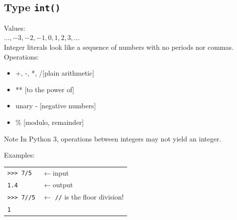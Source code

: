 \documentclass[t,handout,9pt]{beamer}
\begin{document}
\subsection{Type \texttt{int()}}
\begin{frame}
Values:\\
\qquad $\ldots, -3, -2, -1, 0, 1, 2, 3, \ldots$\\
Integer literals look like a sequence of numbers with no periods nor commas.\\
Operations:\\
\begin{itemize}
	\item +, -, *, \slash \hfill [plain arithmetic]
	\item ** \hfill [to the power of]
	\item unary - \hfill [negative numbers]
	\item \% \hfill [modulo, remainder]
\end{itemize}
\begin{block}{Note}
In Python 3, operations between integers may not yield an integer.
\end{block}
Examples:
\begin{table}[]
\begin{flushleft}
\begin{tabular}{ll}
\texttt{>{}>{}> 7/5} & $\leftarrow$input  \\
\texttt{1.4}        & $\leftarrow$output\\
\texttt{>{}>{}> 7//5} & $\leftarrow$ \texttt{//} is the floor division!  \\
\texttt{1}        & %
\end{tabular}
\end{flushleft}
\end{table}
\end{frame}
%
\end{document}
